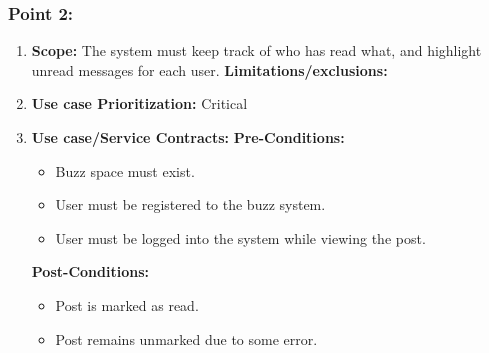 \documentclass[11pt]{article}
\begin{document}
\subsubsection{Point 2:} 
\begin{enumerate}
\item 
\textbf{Scope:}
The system must keep track of who has read what, and highlight unread messages for each user.
\newline
\textbf{Limitations/exclusions:} 

\item 
\textbf{Use case Prioritization:} Critical

\item 
\textbf{Use case/Service Contracts:} 
\newline
\textbf{Pre-Conditions: }
\begin{itemize}
\item Buzz space must exist.
\item User must be registered to the buzz system.
\item User must be logged into the system while viewing the post.
\end{itemize}
 

\textbf{Post-Conditions: }
\begin{itemize}
\item Post is marked as read.
\item Post remains unmarked due to some error.
\end{itemize}
\end{enumerate}
\end{document}
